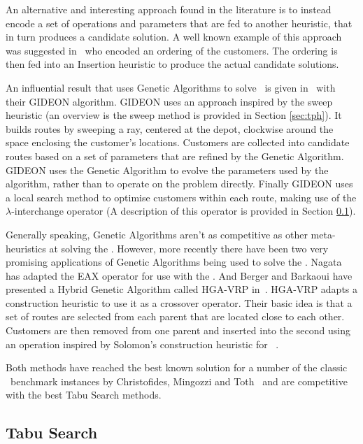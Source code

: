 An alternative and interesting approach found in the literature is to instead encode a set of operations and parameters that are fed to another heuristic, that in turn produces a candidate solution. A well known example of this approach was suggested in~\cite{BW:1993} who encoded an ordering of the customers. The ordering is then fed into an Insertion heuristic to produce the actual candidate solutions.

An influential result that uses Genetic Algorithms to solve \VRPTW\ is given in~\cite{TNJ:1991} with their GIDEON algorithm. GIDEON uses an approach inspired by the sweep heuristic (an overview is the sweep method is provided in Section \ref{sec:tph}). It builds routes by sweeping a ray, centered at the depot, clockwise around the space enclosing the customer's locations. Customers are collected into candidate routes based on a set of parameters that are refined by the Genetic Algorithm. GIDEON uses the Genetic Algorithm to evolve the parameters used by the algorithm, rather than to operate on the problem directly. Finally GIDEON uses a local search method to optimise customers within each route, making use of the $\lambda$-interchange operator (A description of this operator is provided in Section \ref{sec:ts}).

Generally speaking, Genetic Algorithms aren't as competitive as other meta-heuristics at solving the \VRP. However, more recently there have been two very promising applications of Genetic Algorithms being used to solve the \VRP. Nagata~\cite{Nagata:2007} has adapted the EAX operator for use with the \VRP. And Berger and Barkaoui have presented a Hybrid Genetic Algorithm called HGA-VRP in~\cite{BM:2003}. HGA-VRP adapts a construction heuristic to use it as a crossover operator. Their basic idea is that a set of routes are selected from each parent that are located close to each other. Customers are then removed from one parent and inserted into the second using an operation inspired by Solomon's construction heuristic for \VRPTW~\cite{Solomon:1987}.

Both methods have reached the best known solution for a number of the classic \VRP\ benchmark instances by Christofides, Mingozzi and Toth~\cite{CMT:1981} and are competitive with the best Tabu Search methods.

\subsection{Tabu Search}
\label{sec:ts}

